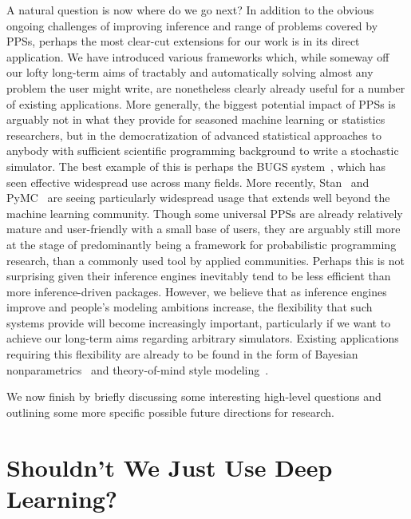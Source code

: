 A natural question is now where do we go next?  In addition to the obvious ongoing challenges
of improving inference and range of problems covered by PPSs, perhaps the most clear-cut 
extensions for our
work is in its direct application.  We have introduced various frameworks which, while someway off
our lofty long-term aims of tractably and automatically solving almost any problem the 
user might write, are nonetheless clearly already useful for a number of existing applications.  
More generally, the biggest
potential impact of PPSs is arguably not in what they provide for seasoned machine learning or 
statistics researchers, but in the democratization of advanced statistical approaches to anybody with sufficient
scientific programming background to write a stochastic simulator.  The best example of this is
perhaps the BUGS system~\cite{spiegelhalter1996bugs}, which has seen effective widespread use across
many fields.
More recently, Stan~\citep{carpenter2015stan} and PyMC~\citep{salvatier2016probabilistic} 
are seeing particularly widespread usage that extends well beyond
the machine learning community.  Though some universal PPSs are already relatively 
mature and user-friendly with a small base of users, they are arguably still more
at the stage of predominantly being a framework for probabilistic programming
research, than a commonly used tool by applied communities.  Perhaps this is not surprising given
their inference engines inevitably tend to be less efficient than more inference-driven packages.
However, we believe that as inference engines improve and people's modeling ambitions
increase, the flexibility that such systems provide will become increasingly important,
particularly if we want to achieve our long-term aims regarding arbitrary simulators.
Existing applications requiring this flexibility are already to be found in the form of Bayesian
nonparametrics~\citep{dhir2017interpreting} and theory-of-mind style 
modeling~\citep{stuhlmuller2014reasoning}.

We now finish by briefly discussing some interesting high-level questions and 
outlining some more specific possible future directions for research. 

\section{Shouldn't We Just Use Deep Learning?}

